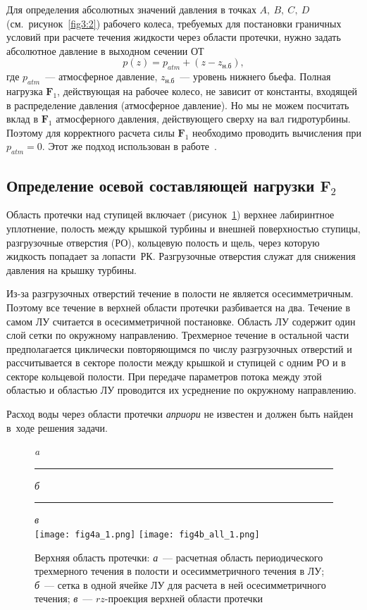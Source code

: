 Для определения абсолютных значений давления в точках $A,\ B,\ C,\ D$ (см.~рисунок~\ref{fig3:2}) рабочего 
колеса, требуемых для постановки граничных условий при расчете течения жидкости через области протечки, 
нужно задать абсолютное давление в выходном сечении ОТ
\begin{equation}
  p(z) = p_{atm} + (z-z_\text{н.б}),
  \label{eq3:5}
\end{equation}
где $p_{atm}$~--- атмосферное давление, $z_\text{н.б}$~--- уровень нижнего бьефа. Полная 
нагрузка $\textbf{F}_1$, действующая на рабочее колесо, не зависит от константы, входящей в 
распределение давления (атмосферное давление). Но мы не можем посчитать вклад в $\textbf{F}_1$ атмосферного 
давления, действующего сверху на вал гидротурбины.
Поэтому для корректного расчета силы $\textbf{F}_1$ необходимо проводить вычисления при $p_{atm}=0$. Этот 
же подход использован в работе~\cite{mak_pilev}.

\subsection{Определение осевой составляющей нагрузки $\textbf{F}_2$}
\label{s:342}
Область протечки над ступицей включает (рисунок~\ref{fig3:4}) верхнее лабиринтное уплотнение,
полость между крышкой турбины и внешней поверхностью ступицы, разгрузочные отверстия (РО), кольцевую полость 
и щель, через которую жидкость попадает за лопасти~РК. Разгрузочные отверстия служат для снижения давления
на крышку турбины.

Из-за разгрузочных отверстий течение в полости не является осесимметричным. Поэтому все течение в верхней 
области протечки разбивается на два. Течение в самом ЛУ считается в осесимметричной постановке.
Область ЛУ содержит один слой сетки по окружному направлению. Трехмерное течение в остальной части 
предполагается циклически повторяющимся по числу разгрузочных отверстий и рассчитывается в секторе полости
между крышкой и ступицей с одним РО и в секторе кольцевой полости. При передаче параметров потока между этой 
областью и областью ЛУ проводится их усреднение по окружному направлению.

Расход воды через области протечки {\it априори} не известен и должен быть найден в~ходе решения задачи.
\begin{figure}[t!]
  \centering \small \emph{a}\rule{52mm}{0mm}\emph{б}\rule{55mm}{0mm}\emph{в}\\[1.5mm]
  {\texttt{[image: fig4a\_1.png]}}\hfill
  {\texttt{[image: fig4b\_all\_1.png]}}
  \caption{Верхняя область протечки: \emph{а}~--- расчетная область периодического трехмерного течения в полости и осесимметричного течения в ЛУ;
  \emph{б}~--- сетка в одной ячейке ЛУ для расчета в ней осесимметричного течения;
  \emph{в}~--- $rz$-проекция верхней области протечки}
  \label{fig3:4}
\end{figure}

